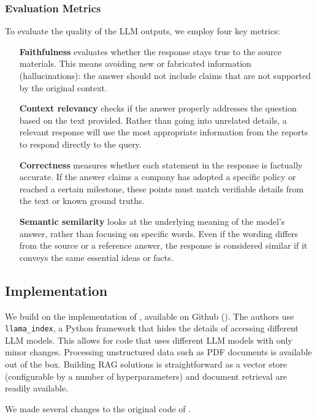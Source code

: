 \documentclass[]{article}
\begin{document}
\subsubsection{Evaluation Metrics}
To evaluate the quality of the LLM outputs, we employ four key metrics:
\begin{itemize}
    \item [\textbf{Faithfulness}] evaluates whether the response stays true to the source materials. This means avoiding new or fabricated information (hallucinations): the answer should not include claims that are not supported by the original context.
    \item [\textbf{Context relevancy}] checks if the answer properly addresses the question based on the text provided. Rather than going into unrelated details, a relevant response will use the most appropriate information from the reports to respond directly to the query.
    \item [\textbf{Correctness}] measures whether each statement in the response is factually accurate. If the answer claims a company has adopted a specific policy or reached a certain milestone, these points must match verifiable details from the text or known ground truths.
    \item [\textbf{Semantic semilarity}] looks at the underlying meaning of the model’s answer, rather than focusing on specific words. Even if the wording differs from the source or a reference answer, the response is considered similar if it conveys the same essential ideas or facts.
\end{itemize}

\subsection{Implementation}

We build on the implementation of \cite{durability}, available on Github (\cite{github-orig}).
The authors use \texttt{llama\_index}, a Python framework that hides the details of accessing different LLM models.
This allows for code that uses different LLM models with only minor changes.
Processing unstructured data such as PDF documents is available out of the box.
Building RAG solutions is straightforward as a vector store (configurable by a number of hyperparameters) and document retrieval are readily available.

We made several changes to the original code of \cite{durability}.
\end{document}

